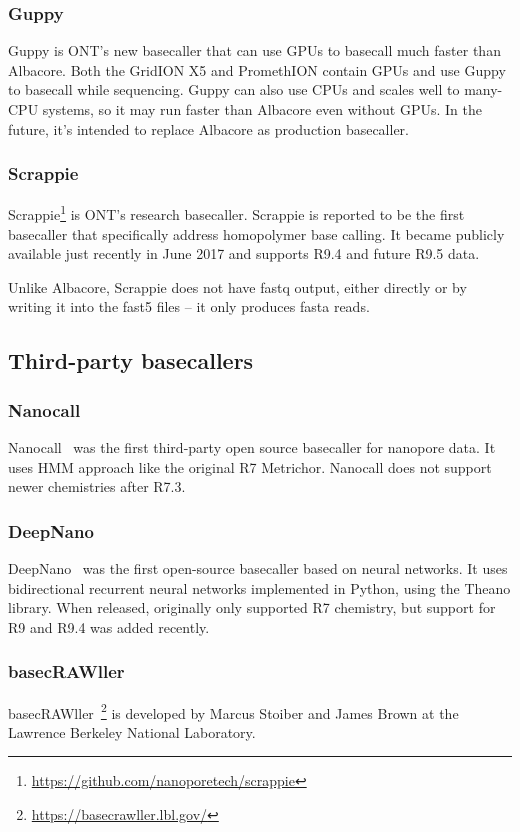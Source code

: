 \documentclass[times, utf8, diplomski, english]{fer}
\begin{document}
\subsubsection{Guppy}
Guppy is ONT's new basecaller that can use GPUs to basecall much faster than Albacore. Both the GridION X5 and PromethION contain GPUs and use Guppy to basecall while sequencing. Guppy can also use CPUs and scales well to many-CPU systems, so it may run faster than Albacore even without GPUs.  In the future, it's intended to replace Albacore as production basecaller.
\subsubsection{Scrappie}
Scrappie\footnote{\url{https://github.com/nanoporetech/scrappie}} is ONT's research basecaller. Scrappie is reported to be the first basecaller that specifically address homopolymer base calling. It became publicly available just recently in June 2017 and supports R9.4 and future R9.5 data.

Unlike Albacore, Scrappie does not have fastq output, either directly or by writing it into the fast5 files – it only produces fasta reads.

\subsection{Third-party basecallers}

\subsubsection{Nanocall}
Nanocall~\citep{David046086} was the first third-party open source basecaller for nanopore data. It uses HMM approach like the original R7 Metrichor. Nanocall does not support newer chemistries after R7.3.

\subsubsection{DeepNano}
DeepNano~\citep{Boza2017}  was the first open-source basecaller based on neural networks. It uses bidirectional recurrent neural networks implemented in Python, using the Theano library. When released, originally only supported R7 chemistry, but support for R9 and R9.4 was added recently.
\subsubsection{basecRAWller}
basecRAWller~\footnote{\url{https://basecrawller.lbl.gov/}} is developed by Marcus Stoiber and James Brown at the Lawrence Berkeley National Laboratory.
\end{document}
